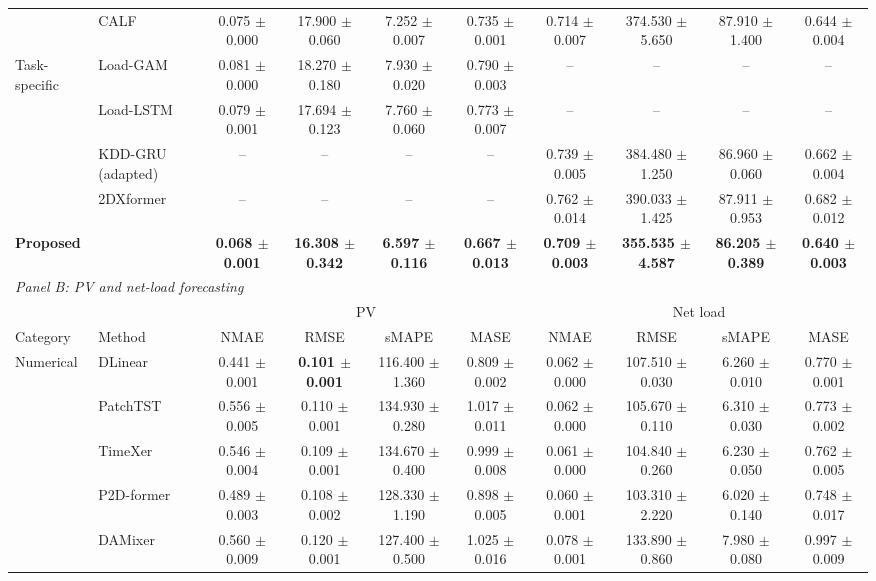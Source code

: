 \documentclass[journal]{IEEEtran}
\begin{document}
\begin{table}[tp]
{\begin{tabular}{llcccccccc}
 & CALF & 0.075 $\pm$ 0.000 & 17.900 $\pm$ 0.060 & 7.252 $\pm$ 0.007 & 0.735 $\pm$ 0.001 & 0.714 $\pm$ 0.007 & 374.530 $\pm$ 5.650 & 87.910 $\pm$ 1.400 & 0.644 $\pm$ 0.004 \\
\cmidrule{1-10}
Task-specific & Load-GAM & 0.081 $\pm$ 0.000 & 18.270 $\pm$ 0.180 & 7.930 $\pm$ 0.020 & 0.790 $\pm$ 0.003 & -- & -- & -- & -- \\
 & Load-LSTM & 0.079 $\pm$ 0.001 & 17.694 $\pm$ 0.123 & 7.760 $\pm$ 0.060 & 0.773 $\pm$ 0.007 & -- & -- & -- & -- \\
 & KDD-GRU (adapted) & -- & -- & -- & -- & 0.739 $\pm$ 0.005 & 384.480 $\pm$ 1.250 & 86.960 $\pm$ 0.060 & 0.662 $\pm$ 0.004 \\
 & 2DXformer & -- & -- & -- & -- & 0.762 $\pm$ 0.014 & 390.033 $\pm$ 1.425 & 87.911 $\pm$ 0.953 & 0.682 $\pm$ 0.012 \\
\midrule
\multicolumn{2}{l}{\textbf{Proposed}} & \textbf{0.068 $\pm$ 0.001} & \textbf{16.308 $\pm$ 0.342} & \textbf{6.597 $\pm$ 0.116} & \textbf{0.667 $\pm$ 0.013} & \textbf{0.709 $\pm$ 0.003} & \textbf{355.535 $\pm$ 4.587} & \textbf{86.205 $\pm$ 0.389} & \textbf{0.640 $\pm$ 0.003} \\
\midrule
\multicolumn{10}{l}{\textit{Panel B: PV and net-load forecasting}} \\
\cmidrule{1-10}
& & \multicolumn{4}{c}{PV} & \multicolumn{4}{c}{Net load} \\
\cmidrule(lr){3-6}\cmidrule(lr){7-10}
Category & Method & NMAE & RMSE & sMAPE & MASE & NMAE & RMSE & sMAPE & MASE \\
\midrule
Numerical & DLinear & 0.441 $\pm$ 0.001 & \textbf{0.101 $\pm$ 0.001} & 116.400 $\pm$ 1.360 & 0.809 $\pm$ 0.002 & 0.062 $\pm$ 0.000 & 107.510 $\pm$ 0.030 & 6.260 $\pm$ 0.010 & 0.770 $\pm$ 0.001 \\
 & PatchTST & 0.556 $\pm$ 0.005 & 0.110 $\pm$ 0.001 & 134.930 $\pm$ 0.280 & 1.017 $\pm$ 0.011 & 0.062 $\pm$ 0.000 & 105.670 $\pm$ 0.110 & 6.310 $\pm$ 0.030 & 0.773 $\pm$ 0.002 \\
 & TimeXer & 0.546 $\pm$ 0.004 & 0.109 $\pm$ 0.001 & 134.670 $\pm$ 0.400 & 0.999 $\pm$ 0.008 & 0.061 $\pm$ 0.000 & 104.840 $\pm$ 0.260 & 6.230 $\pm$ 0.050 & 0.762 $\pm$ 0.005 \\
 & P2D-former & 0.489 $\pm$ 0.003 & 0.108 $\pm$ 0.002 & 128.330 $\pm$ 1.190 & 0.898 $\pm$ 0.005 & 0.060 $\pm$ 0.001 & 103.310 $\pm$ 2.220 & 6.020 $\pm$ 0.140 & 0.748 $\pm$ 0.017 \\
 & DAMixer & 0.560 $\pm$ 0.009 & 0.120 $\pm$ 0.001 & 127.400 $\pm$ 0.500 & 1.025 $\pm$ 0.016 & 0.078 $\pm$ 0.001 & 133.890 $\pm$ 0.860 & 7.980 $\pm$ 0.080 & 0.997 $\pm$ 0.009 \\

\end{tabular}}
\end{table}
\end{document}

